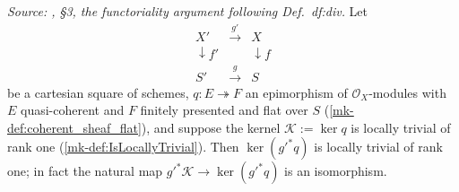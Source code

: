 \begin{lemma}\label{mk-lem:relative_divisor_base_change}
  \leanok

  \textit{Source: \cite{kleiman-picard}, \S 3, the functoriality argument following
  Def.~df:div.}
  Let
  \[
    \begin{array}{ccc}
      X' & \xrightarrow{\ g'\ } & X \\
      \downarrow f' & & \downarrow f \\
      S' & \xrightarrow{\ g\ } & S
    \end{array}
  \]
  be a cartesian square of schemes, \(q : E \twoheadrightarrow F\) an
  epimorphism of \(\mathcal O_X\)-modules with \(E\) quasi-coherent and
  \(F\) finitely presented and flat over \(S\)
  (\ref{mk-def:coherent_sheaf_flat}), and suppose the kernel
  \(\mathcal K := \ker q\) is locally trivial of rank one
  (\ref{mk-def:IsLocallyTrivial}).  Then \(\ker (g'^* q)\) is locally trivial
  of rank one; in fact the natural map \(g'^* \mathcal K \to \ker(g'^* q)\)
  is an isomorphism.
\end{lemma}
